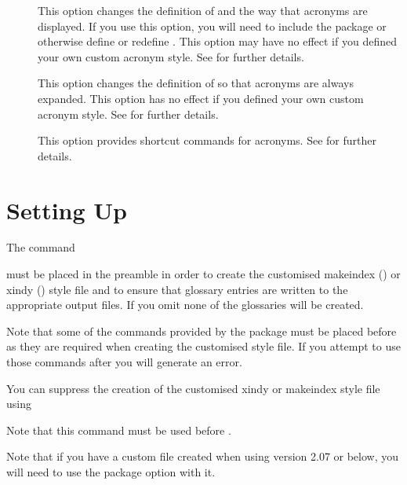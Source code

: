 \documentclass[report]{nlctdoc}
\begin{document}
\begin{description}
\item[] This option changes the definition of
 and the way that acronyms are displayed. If you use
this option, you will need to include the  package or
otherwise define  or redefine .
This option may have no effect if you defined your own custom acronym
style. See  for further details.

\item[] This option changes the definition of
 so that acronyms are always expanded. This
option has no effect if you defined your own custom acronym style. 
See  for further details.

\item[] This option provides shortcut commands
for acronyms.  See  for further details.

\end{description}

\chapter{Setting Up}
\label{sec:setup}

The command
\begin{definition}[\DescribeMacro{\makeglossaries}]
\end{definition}
must be placed in the preamble in order to create the customised
\gls{makeindex} () or \gls{xindy} ()
style file and to ensure that glossary entries are written to the
appropriate output files. If you omit  none of
the glossaries will be created.

\begin{important}
Note that some of the commands provided by the 
package must be placed before  as they are
required when creating the customised style file. If you attempt
to use those commands after  you will generate
an error.
\end{important}

You can suppress the creation of the customised \gls{xindy}
or \gls{makeindex} style file using
\begin{definition}[\DescribeMacro{\noist}]
\end{definition}
Note that this command must be used before .
\begin{important}
Note that if you have a custom  file created when using 
 version 2.07 or below, you will need to use the
 package option with it.
\end{important}
\end{document}
